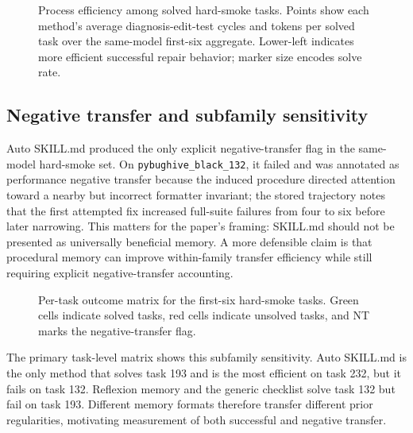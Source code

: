 \begin{figure}[t]
\centering

\caption{Process efficiency among solved hard-smoke tasks. Points show each method's average diagnosis-edit-test cycles and tokens per solved task over the same-model first-six aggregate. Lower-left indicates more efficient successful repair behavior; marker size encodes solve rate.}
\label{fig:hard_first6_efficiency}
\end{figure}

\FloatBarrier
\subsection{Negative transfer and subfamily sensitivity}
\label{sec:results_negative_transfer}

Auto SKILL.md produced the only explicit negative-transfer flag in the same-model hard-smoke set. On \texttt{pybughive\_black\_132}, it failed and was annotated as performance negative transfer because the induced procedure directed attention toward a nearby but incorrect formatter invariant; the stored trajectory notes that the first attempted fix increased full-suite failures from four to six before later narrowing. This matters for the paper's framing: SKILL.md should not be presented as universally beneficial memory. A more defensible claim is that procedural memory can improve within-family transfer efficiency while still requiring explicit negative-transfer accounting.

\begin{figure}[t]
\centering

\caption{Per-task outcome matrix for the first-six hard-smoke tasks. Green cells indicate solved tasks, red cells indicate unsolved tasks, and NT marks the negative-transfer flag.}
\label{fig:hard_first6_task_outcomes}
\end{figure}

The primary task-level matrix shows this subfamily sensitivity. Auto SKILL.md is the only method that solves task 193 and is the most efficient on task 232, but it fails on task 132. Reflexion memory and the generic checklist solve task 132 but fail on task 193. Different memory formats therefore transfer different prior regularities, motivating measurement of both successful and negative transfer.

